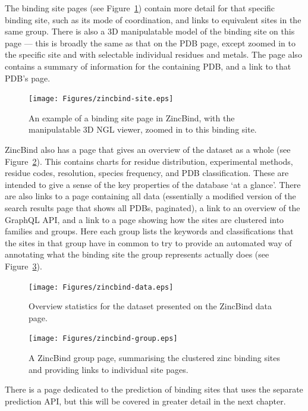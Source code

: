 The binding site pages (see Figure~\ref{fig:zincbind-site}) contain more detail for that specific binding site, such as its mode of coordination, and links to equivalent sites in the same group. There is also a 3D manipulatable model of the binding site on this page --- this is broadly the same as that on the PDB page, except zoomed in to the specific site and with selectable individual residues and metals. The page also contains a summary of information for the containing PDB, and a link to that PDB's page.

\begin{figure}
\centering
\texttt{[image: Figures/zincbind-site.eps]}
\caption[An example of a binding site page in ZincBind.]{\label{fig:zincbind-site} An example of a binding site page in ZincBind, with the manipulatable
3D NGL viewer, zoomed in to this binding site.}
\end{figure}

ZincBind also has a page that gives an overview of the dataset as a whole (see Figure~\ref{fig:zincbind-data}). This contains charts for residue distribution, experimental methods, residue codes, resolution, species frequency, and PDB classification. These are intended to give a sense of the key properties of the database `at a glance'. There are also links to a page containing all data (essentially a modified version of the search results page that shows all PDBs, paginated), a link to an overview of the GraphQL API, and a link to a page showing how the sites are clustered into families and groups. Here each group lists the keywords and classifications that the sites in that group have in common to try to provide an automated way of annotating what the binding site the group represents actually does (see Figure~\ref{fig:zincbind-group}).

\begin{figure}
\centering
\texttt{[image: Figures/zincbind-data.eps]}
\caption{\label{fig:zincbind-data} Overview statistics for the dataset presented on
the ZincBind data page.}
\end{figure}

\begin{figure}
\centering
\texttt{[image: Figures/zincbind-group.eps]}
\caption{\label{fig:zincbind-group} A ZincBind group page, summarising the clustered zinc
binding sites and providing links to individual site pages.}
\end{figure}

There is a page dedicated to the prediction of binding sites that uses the separate prediction API, but this will be covered in greater detail in the next chapter.

